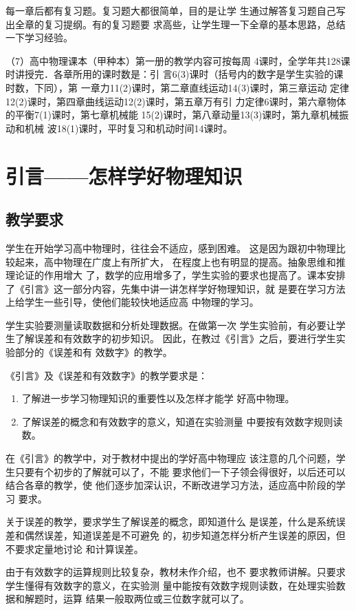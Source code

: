 每一章后都有复习题。复习题大都很简单，目的是让学
生通过解答复习题自己写出全章的复习提纲。有的复习题要
求高些，让学生理一下全章的基本思路，总结一下学习经验。

（7）高中物理课本（甲种本）第一册的教学内容可按每周
4课时，全学年共128课时讲授完．各章所用的课时数是：引
言6(3)课时（括号内的数字是学生实验的课时数，下同），第
一章力11(2)课时，第二章直线运动14(3)课时，第三章运动
定律12(2)课时，第四章曲线运动12(2)课时，第五章万有引
力定律6课时，第六章物体的平衡7(1)课时，第七章机械能
15(2)课时，第八章动量13(3)课时，第九章机械振动和机械
波18(1)课时，平时复习和机动时间14课时。

\chapter{引言——怎样学好物理知识}
\minitoc[n]
\section{教学要求}
学生在开始学习高中物理时，往往会不适应，感到困难。
这是因为跟初中物理比较起来，高中物理在广度上有所扩大，
在程度上也有明显的提高。抽象思维和推理论证的作用增大
了，数学的应用增多了，学生实验的要求也提高了。课本安排
了《引言》这一部分内容，先集中讲一讲怎样学好物理知识，就
是要在学习方法上给学生一些引导，使他们能较快地适应高
中物理的学习。

学生实验要测量读取数据和分析处理数据。在做第一次
学生实验前，有必要让学生了解误差和有效数字的初步知识。
因此，在教过《引言》之后，要进行学生实验部分的《误差和有
效数字》的教学。

《引言》及《误差和有效数字》的教学要求是：
\begin{enumerate}
    \item 了解进一步学习物理知识的重要性以及怎样才能学
好高中物理。
\item 了解误差的概念和有效数字的意义，知道在实验测量
中要按有效数字规则读数。
\end{enumerate}

在《引言》的教学中，对于教材中提出的学好高中物理应
该注意的几个问题，学生只要有个初步的了解就可以了，不能
要求他们一下子领会得很好，以后还可以结合各章的教学，使
他们逐步加深认识，不断改进学习方法，适应高中阶段的学习
要求。

关于误差的教学，要求学生了解误差的概念，即知道什么
是误差，什么是系统误差和偶然误差，知道误差是不可避免
的，初步知道怎样分析产生误差的原因，但不要求定量地讨论
和计算误差。

由于有效数字的运算规则比较复杂，教材未作介绍，也不
要求教师讲解。只要求学生懂得有效数字的意义，在实验测
量中能按有效数字规则读数，在处理实验数据和解题时，运算
结果一般取两位或三位数字就可以了。

